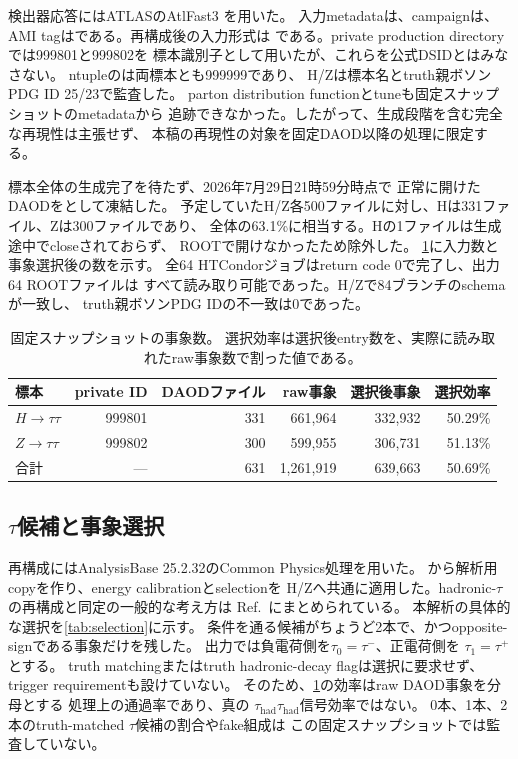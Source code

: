 \documentclass[xelatex,ja=standard,a4paper,10pt,twocolumn]{bxjsarticle}
\begin{document}
検出器応答にはATLASのAtlFast3
\cite{ATLASDetector,AtlFast3}を用いた。
入力metadataは、campaignは、
AMI tagはである。再構成後の入力形式は
である。private production directoryでは999801と999802を
標本識別子として用いたが、これらを公式DSIDとはみなさない。
ntupleのは両標本とも999999であり、
H/Zは標本名とtruth親ボソンPDG ID 25/23で監査した。
parton distribution functionとtuneも固定スナップショットのmetadataから
追跡できなかった。したがって、生成段階を含む完全な再現性は主張せず、
本稿の再現性の対象を固定DAOD以降の処理に限定する。

標本全体の生成完了を待たず、2026年7月29日21時59分時点で
正常に開けたDAODをとして凍結した。
予定していたH/Z各500ファイルに対し、Hは331ファイル、Zは300ファイルであり、
全体の63.1\%に相当する。Hの1ファイルは生成途中でcloseされておらず、
ROOTで開けなかったため除外した。
\cref{tab:sample_counts}に入力数と事象選択後の数を示す。
全64 HTCondorジョブはreturn code 0で完了し、出力64 ROOTファイルは
すべて読み取り可能であった。H/Zで84ブランチのschemaが一致し、
truth親ボソンPDG IDの不一致は0であった。

\begin{table}[t]
  \centering
  \caption{固定スナップショットの事象数。
    選択効率は選択後entry数を、実際に読み取れたraw事象数で割った値である。}
  \label{tab:sample_counts}
  \begin{tabular}{lrrrrr}
    \toprule
    標本 & private ID & DAODファイル & raw事象 & 選択後事象 & 選択効率 \\
    \midrule
    \(H\rightarrow\tau\tau\) & 999801 & 331 & 661,964 & 332,932 & 50.29\% \\
    \(Z\rightarrow\tau\tau\) & 999802 & 300 & 599,955 & 306,731 & 51.13\% \\
    \midrule
    合計 & --- & 631 & 1,261,919 & 639,663 & 50.69\% \\
    \bottomrule
  \end{tabular}
\end{table}

\subsection{\(\tau\)候補と事象選択}
\label{subsec:selection}

再構成にはAnalysisBase 25.2.32のCommon Physics処理を用いた。
から解析用copyを作り、energy calibrationとselectionを
H/Zへ共通に適用した。hadronic-\(\tau\)の再構成と同定の一般的な考え方は
Ref.~\cite{ATLASTauID}にまとめられている。
本解析の具体的な選択を\cref{tab:selection}に示す。
条件を通る候補がちょうど2本で、かつopposite-signである事象だけを残した。
出力では負電荷側を\(\tau_0=\tau^-\)、正電荷側を
\(\tau_1=\tau^+\)とする。
truth matchingまたはtruth hadronic-decay flagは選択に要求せず、
trigger requirementも設けていない。
そのため、\cref{tab:sample_counts}の効率はraw DAOD事象を分母とする
処理上の通過率であり、真の
\(\tau_{\mathrm{had}}\tau_{\mathrm{had}}\)信号効率ではない。
0本、1本、2本のtruth-matched \(\tau\)候補の割合やfake組成は
この固定スナップショットでは監査していない。
\end{document}
